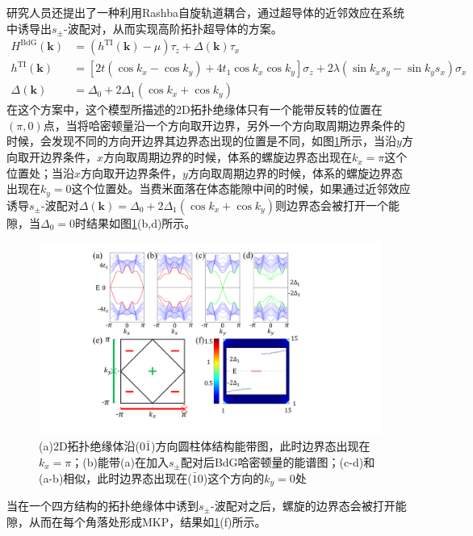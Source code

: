 \qquad 研究人员还提出了一种利用Rashba自旋轨道耦合，通过超导体的近邻效应在系统中诱导出$s_\pm$-波配对，从而实现高阶拓扑超导体的方案\cite{re27}。
\begin{equation}
\begin{aligned}
H^{\mathrm{BdG}}(\mathbf{k})&=(h^{\mathrm{TI}}(\mathbf{k})-\mu)\tau_z+\Delta(\mathbf{k})\tau_x\\
h^{\mathrm{TI}}(\mathbf{k})&=\left[2t(\cos k_x-\cos k_y)+4t_1\cos k_x\cos k_y\right]\sigma_z+2\lambda(\sin k_xs_y-\sin k_ys_x)\sigma_x\\
\Delta(\mathbf{k})&=\Delta_0+2\Delta_1(\cos k_x+\cos k_y)\label{hosc2}
\end{aligned}
\end{equation}
\qquad 在这个方案中，这个模型所描述的2D拓扑绝缘体只有一个能带反转的位置在$(\pi,0)$点，当将哈密顿量沿一个方向取开边界，另外一个方向取周期边界条件的时候，会发现不同的方向开边界其边界态出现的位置是不同，如图\ref{fig12}所示，当沿$y$方向取开边界条件，$x$方向取周期边界的时候，体系的螺旋边界态出现在$k_x=\pi$这个位置处；当沿$x$方向取开边界条件，$y$方向取周期边界的时候，体系的螺旋边界态出现在$k_y=0$这个位置处。当费米面落在体态能隙中间的时候，如果通过近邻效应诱导$s_\pm$-波配对$\Delta(\mathbf{k})=\Delta_0+2\Delta_1(\cos k_x+\cos k_y)$则边界态会被打开一个能隙，当$\Delta_0=0$时结果如图\ref{fig12}(b,d)所示。
\begin{figure}[h]
\centering
\includegraphics[scale=0.7]{pic/fig13}
\caption{(a)2D拓扑绝缘体沿($0\bar{1}$)方向圆柱体结构能带图，此时边界态出现在$k_x=\pi$；(b)能带(a)在加入$s_\pm$配对后BdG哈密顿量的能谱图；(c-d)和(a-b)相似，此时边界态出现在($\bar{1}0$)这个方向的$k_y=0$处}\label{fig12}
\end{figure}
当在一个四方结构的拓扑绝缘体中诱到$s_\pm$-波配对之后，螺旋的边界态会被打开能隙，从而在每个角落处形成MKP，结果如\ref{fig12}(f)所示。

